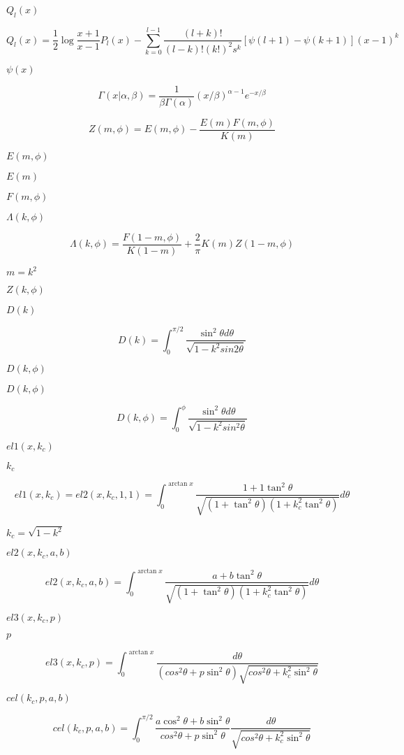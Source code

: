 \documentclass{article}
\begin{document}
$ Q_l(x) $
\pagebreak

\[ Q_l(x) = \frac{1}{2} \log{\frac{x+1}{x-1}} P_l(x) - \sum_{k=0}^{l-1}\frac{(l+k)!}{(l-k)!(k!)^2s^k} \left[\psi(l+1) - \psi(k+1)\right](x-1)^k \]
\pagebreak

$ \psi(x) $
\pagebreak

\[ \Gamma(x|\alpha,\beta) = \frac{1}{\beta\Gamma(\alpha)} (x/\beta)^{\alpha - 1} e^{-x/\beta} \]
\pagebreak

\[ Z(m,\phi) = E(m,\phi) - \frac{E(m)F(m,\phi)}{K(m)} \]
\pagebreak

$ E(m,\phi) $
\pagebreak

$ E(m) $
\pagebreak

$ F(m,\phi) $
\pagebreak

$ \Lambda(k,\phi) $
\pagebreak

\[ \Lambda(k,\phi) = \frac{F(1-m,\phi)}{K(1-m)} + \frac{2}{\pi} K(m) Z(1-m,\phi) \]
\pagebreak

$ m = k^2 $
\pagebreak

$ Z(k,\phi) $
\pagebreak

$ D(k) $
\pagebreak

\[ D(k) = \int_0^{\pi/2} \frac{\sin^2\theta d\theta}{\sqrt{1-k^2sin2\theta}} \]
\pagebreak

$ D(k, \phi) $
\pagebreak

$ D(k,\phi) $
\pagebreak

\[ D(k,\phi) = \int_0^\phi \frac{\sin^2\theta d\theta}{\sqrt{1-k^2sin^2\theta}} \]
\pagebreak

$ el1(x,k_c) $
\pagebreak

$ k_c $
\pagebreak

\[ el1(x,k_c) = el2(x,k_c,1,1) = \int_0^{\arctan x} \frac{1+1\tan^2\theta} {\sqrt{(1+\tan^2\theta)(1+k_c^2\tan^2\theta)}}d\theta \]
\pagebreak

$ k_c = \sqrt{1 - k^2} $
\pagebreak

$ el2(x,k_c,a,b) $
\pagebreak

\[ el2(x,k_c,a,b) = \int_0^{\arctan x} \frac{a+b\tan^2\theta} {\sqrt{(1+\tan^2\theta)(1+k_c^2\tan^2\theta)}}d\theta \]
\pagebreak

$ el3(x,k_c,p) $
\pagebreak

$ p $
\pagebreak

\[ el3(x,k_c,p) = \int_0^{\arctan x} \frac{d\theta} {(cos^2\theta+p\sin^2\theta)\sqrt{cos^2\theta+k_c^2\sin^2\theta}} \]
\pagebreak

$ cel(k_c,p,a,b) $
\pagebreak

\[ cel(k_c,p,a,b)=\int_0^{\pi/2} \frac{a\cos^2\theta + b\sin^2\theta}{cos^2\theta + p\sin^2\theta} \frac{d\theta}{\sqrt{cos^2\theta + k_c^2\sin^2\theta}} \]
\pagebreak
\end{document}
